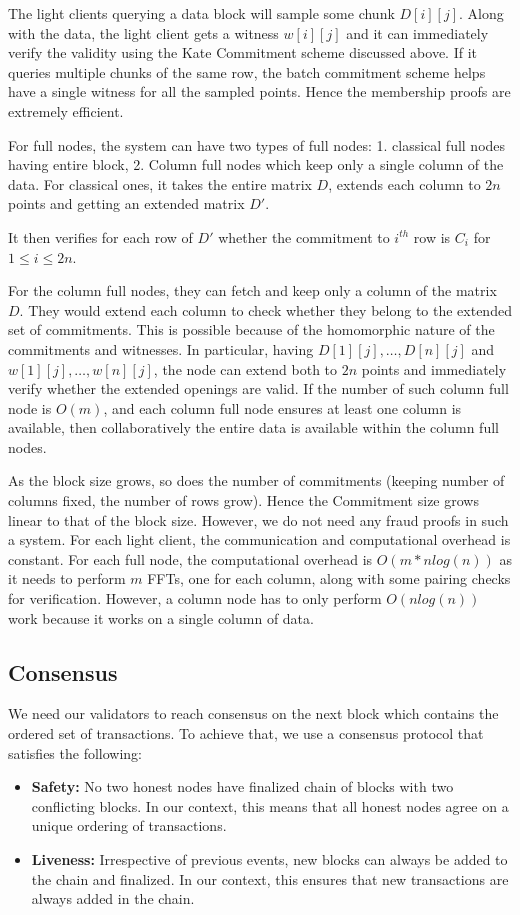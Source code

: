 \documentclass[sigconf, screen=true, nonacm]{acmart}
\begin{document}
        The light clients querying a data block will sample some chunk $D[i][j]$. Along with the data, the light client gets a witness $w[i][j]$ and it can immediately verify the validity using the Kate Commitment scheme discussed above. If it queries multiple chunks of the same row, the batch commitment scheme helps have a single witness for all the sampled points. Hence the membership proofs are extremely efficient. 

        For full nodes, the system can have two types of full nodes: 1. classical full nodes having entire block, 2. Column full nodes which keep only a single column of the data. For classical ones, it takes the entire matrix $D$, extends each column to $2n$ points and getting an extended matrix $D'$. 

        It then verifies for each row of $D'$ whether the commitment to $i^{th}$ row is $C_i$ for $1 \leq i \leq 2n$. 

        For the column full nodes, they can fetch and keep only a column of the matrix $D$. They would extend each column to check whether they belong to the extended set of commitments. This is possible because of the homomorphic nature of the commitments and witnesses. In particular, having $D[1][j], \dots, D[n][j]$ and $w[1][j], \dots, w[n][j]$, the node can extend both to $2n$ points and immediately verify whether the extended openings are valid. If the number of such column full node is $O(m)$, and each column full node ensures at least one column is available, then collaboratively the entire data is available within the column full nodes. 

        As the block size grows, so does the number of commitments (keeping number of columns fixed, the number of rows grow). Hence the Commitment size grows linear to that of the block size. However, we do not need any fraud proofs in such a system. For each light client, the communication and computational overhead is constant. For each full node, the computational overhead is $O(m*n log(n))$ as it needs to perform $m$ FFTs, one for each column, along with some pairing checks for verification. However, a column node has to only perform $O(n log(n))$ work because it works on a single column of data. 

    \subsection{Consensus}
        We need our validators to reach consensus on the next block which contains the ordered set of transactions. To achieve that, we use a consensus protocol that satisfies the following:
        \begin{itemize}
            \item \textbf{Safety:} No two honest nodes have finalized chain of blocks with two conflicting blocks. In our context, this means that all honest nodes agree on a unique ordering of transactions. 
            \item \textbf{Liveness:} Irrespective of previous events, new blocks can always be added to the chain and finalized. In our context, this ensures that new transactions are always added in the chain. 
        \end{itemize} 
\end{document}
